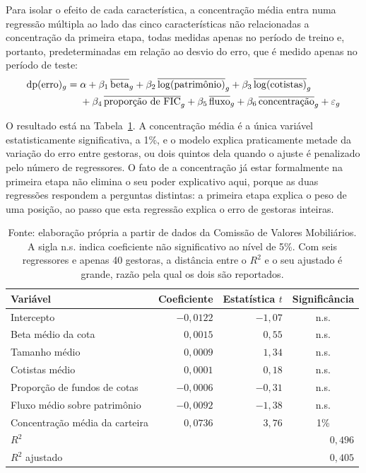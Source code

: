 \documentclass[12pt,a4paper]{article}
\begin{document}
\FloatBarrier

Para isolar o efeito de cada característica, a concentração média entra numa regressão
múltipla ao lado das cinco características não relacionadas a concentração da primeira etapa,
todas medidas apenas no período de treino e, portanto, predeterminadas em relação ao desvio
do erro, que é medido apenas no período de teste:
\begin{align}
\text{dp}(\text{erro})_g = {}& \alpha + \beta_1\,\overline{\text{beta}}_g +
\beta_2\,\overline{\log(\text{patrimônio})}_g + \beta_3\,\overline{\log(\text{cotistas})}_g \notag\\
& + \beta_4\,\overline{\text{proporção de FIC}}_g + \beta_5\,\overline{\text{fluxo}}_g +
\beta_6\,\overline{\text{concentração}}_g + \varepsilon_g
\label{eq:regressao-variancia}
\end{align}

O resultado está na Tabela~\ref{tab:regressao-variancia}. A concentração média é a
única variável estatisticamente significativa, a 1\%, e o modelo explica praticamente metade
da variação do erro entre gestoras, ou dois quintos dela quando o ajuste é penalizado pelo
número de regressores. O fato de a concentração já estar formalmente na primeira etapa não
elimina o seu poder explicativo aqui, porque as duas regressões respondem a
perguntas distintas: a primeira etapa explica o peso de uma posição, ao passo que esta
regressão explica o erro de gestoras inteiras.

\begin{table}[h]\centering\small
\caption{Regressão do desvio-padrão do erro fora da amostra por gestora, conforme a
equação~\eqref{eq:regressao-variancia}, em 40 gestoras.}
\label{tab:regressao-variancia}
\begin{tabular}{@{}lrrc@{}}
\toprule
Variável & Coeficiente & Estatística $t$ & Significância \\
\midrule
Intercepto & $-0{,}0122$ & $-1{,}07$ & n.s. \\
Beta médio da cota & $0{,}0015$ & $0{,}55$ & n.s. \\
Tamanho médio & $0{,}0009$ & $1{,}34$ & n.s. \\
Cotistas médio & $0{,}0001$ & $0{,}18$ & n.s. \\
Proporção de fundos de cotas & $-0{,}0006$ & $-0{,}31$ & n.s. \\
Fluxo médio sobre patrimônio & $-0{,}0092$ & $-1{,}38$ & n.s. \\
Concentração média da carteira & $0{,}0736$ & $3{,}76$ & 1\% \\
\midrule
$R^2$ & \multicolumn{3}{r}{$0{,}496$} \\
$R^2$ ajustado & \multicolumn{3}{r}{$0{,}405$} \\
\bottomrule
\end{tabular}
\caption*{\footnotesize Fonte: elaboração própria a partir de dados da Comissão de Valores
Mobiliários. A sigla n.s. indica coeficiente não significativo ao nível de 5\%. Com seis
regressores e apenas 40 gestoras, a distância entre o $R^2$ e o seu ajustado é grande, razão
pela qual os dois são reportados.}
\end{table}
\end{document}
